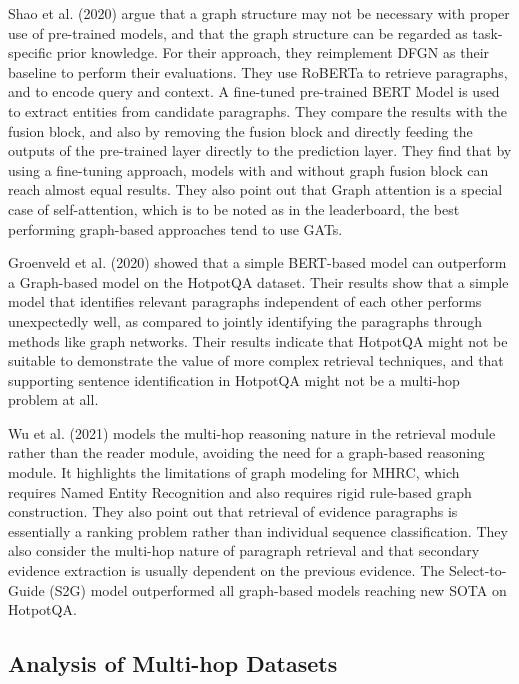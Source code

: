 \documentclass[sigplan,screen,nonacm]{acmart}
\begin{document}
Shao et al. (2020) \cite{RN127} argue that a graph structure may not be necessary with proper use of pre-trained models, and that the graph 
structure can be regarded as task-specific prior knowledge. For their approach, they reimplement DFGN \cite{RN122} as their baseline to perform 
their evaluations. They use RoBERTa \cite{RN171} to retrieve paragraphs, and to encode query and context. A fine-tuned pre-trained BERT Model 
is used to extract entities from candidate paragraphs. They compare the results with the fusion block, and also by removing the fusion block 
and directly feeding the outputs of the pre-trained layer directly to the prediction layer. They find that by using a fine-tuning approach, 
models with and without graph fusion block can reach almost equal results. They also point out that Graph 
attention is a special case of self-attention, which is to be noted as in the leaderboard, the best performing graph-based approaches tend 
to use GATs.

Groenveld et al. (2020) \cite{RN126} showed that a simple BERT-based model can outperform a Graph-based model on the HotpotQA dataset.
Their results show that a simple model that identifies relevant paragraphs independent of each other performs unexpectedly well, as compared to 
jointly identifying the paragraphs through methods like graph networks. Their results indicate that HotpotQA might not be suitable to 
demonstrate the value of more complex retrieval techniques, and that supporting sentence identification in HotpotQA might not be a multi-hop 
problem at all.

Wu et al. (2021) \cite{RN106} models the multi-hop reasoning nature in the retrieval module rather than the reader module, avoiding the need 
for a graph-based reasoning module. It highlights the limitations of graph modeling for MHRC, which requires Named Entity Recognition and 
also requires rigid rule-based graph construction. They also point out that retrieval of evidence paragraphs is essentially a ranking problem 
rather than individual sequence classification. They also consider the multi-hop nature of paragraph retrieval and that secondary evidence 
extraction is usually dependent on the previous evidence. The Select-to-Guide (S2G) model outperformed all graph-based models reaching new 
SOTA on HotpotQA.



\subsection{Analysis of Multi-hop Datasets}
\end{document}
